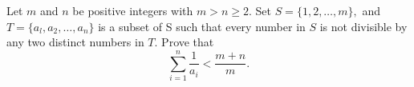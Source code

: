 Let $ m$ and $ n$ be positive integers with $ m > n \geq 2.$ Set $ S = \{1, 2, \ldots, m\},$ and $ T = \{a_l, a_2, \ldots, a_n\}$ is a subset of S such that every number in $ S$ is not divisible by any two distinct numbers in $ T.$ Prove that\[ \sum^n_{i = 1} \frac {1}{a_i} < \frac {m + n}{m}.

\]
